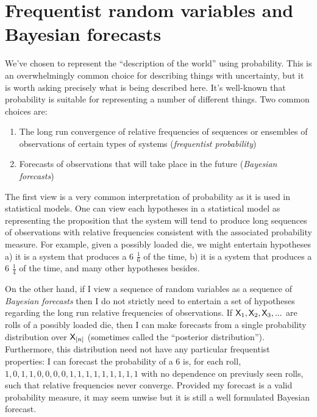 \section{Frequentist random variables and Bayesian forecasts}

We've chosen to represent the ``description of the world'' using probability. This is an overwhelmingly common choice for describing things with uncertainty, but it is worth asking precisely what is being described here. It's well-known that probability is suitable for representing a number of different things. Two common choices are:

\begin{enumerate}
    \item The long run convergence of relative frequencies of sequences or ensembles of observations of certain types of systems (\emph{frequentist probability})
    \item Forecasts of observations that will take place in the future (\emph{Bayesian forecasts})
\end{enumerate}

The first view is a very common interpretation of probability as it is used in statistical models. One can view each hypotheses in a statistical model as representing the proposition that the system will tend to produce long sequences of observations with relative frequencies consistent with the associated probability measure. For example, given a possibly loaded die, we might entertain hypotheses a) it is a system that produces a 6 $\frac{1}{6}$ of the time, b) it is a system that produces a 6 $\frac{1}{4}$ of the time, and many other hypotheses besides. 

On the other hand, if I view a sequence of random variables as a sequence of \emph{Bayesian forecasts} then I do not strictly need to entertain a set of hypotheses regarding the long run relative frequencies of observations. If $\mathsf{X}_1,\mathsf{X}_2,\mathsf{X}_3,...$ are rolls of a possibly loaded die, then I can make forecasts from a single probability distribution over $\mathsf{X}_{[n]}$ (sometimes called the ``posterior distribution''). Furthermore, this distribution need not have any particular frequentist properties: I can forecast the probability of a $6$ is, for each roll, $1,0,1,1,0,0,0,0,1,1,1,1,1,1,1,1,1$ with no dependence on previusly seen rolls, such that relative frequencies never converge. Provided my forecast is a valid probability measure, it may seem unwise but it is still a well formulated Bayesian forecast.

